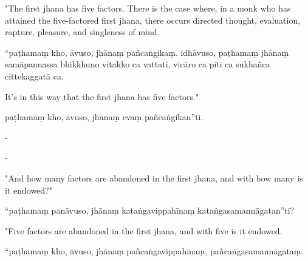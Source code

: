 \begin{samepage}
\begin{leftcolumn*}
"The first jhana has five factors. There is the case where, in a monk who has attained the five-factored first jhana, there occurs directed thought, evaluation, rapture, pleasure, and singleness of mind.
\end{leftcolumn*}

\begin{rightcolumn}
“paṭhamaṃ kho, āvuso, jhānaṃ pañcaṅgikaṃ. idhāvuso, paṭhamaṃ jhānaṃ samāpannassa bhikkhuno vitakko ca vattati, vicāro ca pīti ca sukhañca cittekaggatā ca.
\end{rightcolumn}
\end{samepage}

\begin{samepage}
\begin{leftcolumn*}
It's in this way that the first jhana has five factors."
\end{leftcolumn*}

\begin{rightcolumn}
paṭhamaṃ kho, āvuso, jhānaṃ evaṃ pañcaṅgikan”ti.
\end{rightcolumn}
\end{samepage}

\begin{samepage}
\begin{leftcolumn*}
-
\end{leftcolumn*}

\begin{rightcolumn}
-
\end{rightcolumn}
\end{samepage}

\begin{samepage}
\begin{leftcolumn*}
"And how many factors are abandoned in the first jhana, and with how many is it endowed?"
\end{leftcolumn*}

\begin{rightcolumn}
“paṭhamaṃ panāvuso, jhānaṃ kataṅgavippahīnaṃ kataṅgasamannāgatan”ti?
\end{rightcolumn}
\end{samepage}

\begin{samepage}
\begin{leftcolumn*}
"Five factors are abandoned in the first jhana, and with five is it endowed.
\end{leftcolumn*}

\begin{rightcolumn}
“paṭhamaṃ kho, āvuso, jhānaṃ pañcaṅgavippahīnaṃ, pañcaṅgasamannāgataṃ.
\end{rightcolumn}
\end{samepage}


